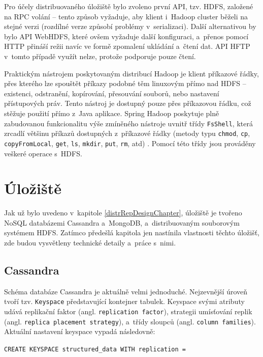 \noindent Pro účely distribuovaného úložiště bylo zvoleno první API, tzv. HDFS, založené na RPC volání -- tento způsob vyžaduje, aby klient i~Hadoop cluster běželi na stejné verzi (rozdílné verze způsobí problémy v~serializaci). Další alternativou by bylo API WebHDFS, které ovšem vyžaduje další konfiguraci, a~přenos pomocí HTTP přináší režii navíc ve formě zpomalení ukládání a~čtení dat.
API HFTP v~tomto případě využít nelze, protože podporuje pouze čtení.

Praktickým nástrojem poskytovaným distribucí Hadoop je klient příkazové řádky, přes kterého lze spouštět příkazy podobné těm linuxovým přímo nad HDFS -- existenci, odstranění, kopírování, přesouvání souborů, nebo nastavení přístupových práv. Tento nástroj je dostupný pouze přes příkazovou řádku, což stěžuje použití přímo z~Java aplikace. Spring Hadoop poskytuje plně zabudovanou funkcionalitu výše zmíněného nástroje uvnitř třídy \texttt{FsShell}, která zrcadlí většinu příkazů dostupných z~příkazové řádky (metody typu \texttt{chmod}, \texttt{cp}, \texttt{copyFromLocal}, \texttt{get}, \texttt{ls}, \texttt{mkdir}, \texttt{put}, \texttt{rm}, atd) \cite{springHadoopReference}. Pomocí této třídy jsou prováděny veškeré operace s~HDFS.

\section{Úložiště}
Jak už bylo uvedeno v~kapitole \ref{distrRepDesignChapter}, úložiště je tvořeno NoSQL databázemi Cassandra a~MongoDB, a~distribuovaným souborovým systémem HDFS. Zatímco předešlá kapitola jen nastínila vlastnosti těchto úložišť, zde budou vysvětleny technické detaily a~práce s~nimi.

\subsection{Cassandra} \label{cassandra}
Schéma databáze Cassandra je aktuálně velmi jednoduché. Nejzevnější úroveň tvoří tzv. \texttt{Keyspace} představující kontejner tabulek. Keyspace svými atributy udává replikační faktor (angl. \texttt{replication factor}), strategii umísťování replik (angl. \texttt{replica placement strategy}), a~třídy sloupců (angl. \texttt{column families}). Aktuální nastavení keyspace vypadá následovně:

\vspace{0.5cm}
\texttt{CREATE KEYSPACE structured\_data WITH replication = }

\texttt{ }

